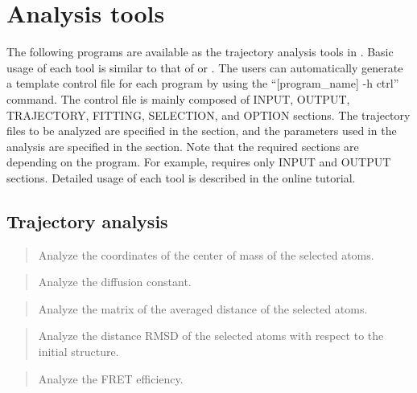 \documentclass[a4paper,11pt,oneside,english]{sphinxmanual}
\begin{document}
\section{Analysis tools}
\label{\detokenize{02_Available_Programs:analysis-tools}}
The following programs are available as the trajectory analysis tools in .
Basic usage of each tool is similar to that of  or .
The users can automatically generate a template control file for each program
by using the “{[}program\_name{]} -h ctrl” command.
The control file is mainly composed of INPUT, OUTPUT, TRAJECTORY,
FITTING, SELECTION, and OPTION sections.
The trajectory files to be analyzed are specified in the \sphinxstylestrong{{[}TRAJECTORY{]}} section,
and the parameters used in the analysis are specified in the \sphinxstylestrong{{[}OPTION{]}} section.
Note that the required sections are depending on the program.
For example,  requires only INPUT and OUTPUT sections.
Detailed usage of each tool is described in the online tutorial.


\subsection{Trajectory analysis}
\label{\detokenize{02_Available_Programs:trajectory-analysis}}
\begin{quote}

Analyze the coordinates of the center of mass of the selected atoms.
\end{quote}

\begin{quote}

Analyze the diffusion constant.
\end{quote}

\begin{quote}

Analyze the matrix of the averaged distance of the selected atoms.
\end{quote}

\begin{quote}

Analyze the distance RMSD of the selected atoms
with respect to the initial structure.
\end{quote}

\begin{quote}

Analyze the FRET efficiency.
\end{quote}
\end{document}
